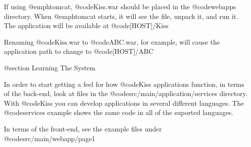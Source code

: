 If using @emph{tomcat}, @code{Kiss.war} should be placed in the
@code{webapps} directory.  When @emph{tomcat} starts, it will see the
file, unpack it, and run it.  The application will be available at
@code{[HOST]/Kiss}

Renaming @code{Kiss.war} to @code{ABC.war}, for example, will cause
the application path to change to @code{[HOST]/ABC}

@section Learning The System

In order to start getting a feel for how @code{Kiss} applications
function, in terms of the back-end, look at files in the
@code{src/main/application/services} directory.  With @code{Kiss} you can
develop applications in several different languages.  The @code{services}
example shows the same code in all of the suported languages.

In terms of the front-end, see the example files under @code{src/main/webapp/page1}
